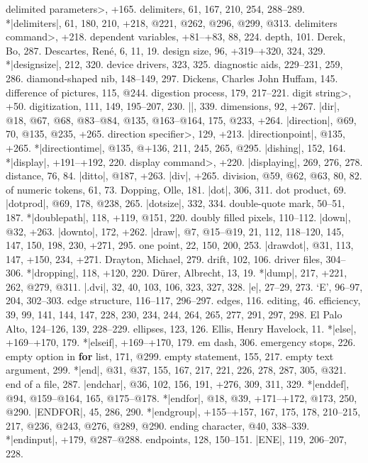 \<delimited parameters>, +165.
delimiters, 61, 167, 210, 254, 288--289.
*|delimiters|, 61, 180, 210, +218, @221, @262, @296, @299, @313.
\<delimiters command>, +218.
dependent variables, +81--+83, 88, 224.
depth, 101.
Derek, Bo, 287.
Descartes, Ren\'e, 6, 11, 19.
design size, 96, +319--+320, 324, 329.
*|designsize|, 212, 320.
device drivers, 323, 325.
diagnostic aids, 229--231, 259, 286.
diamond-shaped nib, 148--149, 297.
Dickens, Charles John Huffam, 145.
difference of pictures, 115, @244.
digestion process, 179, 217--221.
\<digit string>, +50.
digitization, 111, 149, 195--207, 230.
|\digits|, 339.
dimensions, 92, +267.
|dir|, @18, @67, @68, @83--@84, @135, @163--@164, 175, @233, +264.
|direction|, @69, 70, @135, @235, +265.
\<direction specifier>, 129, +213.
|directionpoint|, @135, +265.
*|directiontime|, @135, @+136, 211, 245, 265, @295.
|dishing|, 152, 164.
*|display|, +191--+192, 220.
\<display command>, +220.
|displaying|, 269, 276, 278.
distance, 76, 84.
|ditto|, @187, +263.
|div|, +265.
division, @59, @62, @63, 80, 82.
\sub of numeric tokens, 61, 73.
Dopping, Olle, 181.
|dot|, 306, 311.
dot product, 69.
|dotprod|, @69, 178, @238, 265.
|dotsize|, 332, 334.
double-quote mark, 50--51, 187.
*|doublepath|, 118, +119, @151, 220.
doubly filled pixels, 110--112.
|down|, @32, +263.
|downto|, 172, +262.
|draw|, @7, @15--@19, 21, 112, 118--120, 145, 147, 150, 198, 230, +271, 295.
\sub one point, 22, 150, 200, 253.
|drawdot|, @31, 113, 147, +150, 234, +271.
Drayton, Michael, 279.
drift, 102, 106.
driver files, 304--306.
*|dropping|, 118, +120, 220.
D\"urer, Albrecht, 13, 19.
*|dump|, 217, +221, 262, @279, @311.
|.dvi|, 32, 40, 103, 106, 323, 327, 328.
\newletter
|e|, 27--29, 273.
`E', 96--97, 204, 302--303.
edge structure, 116--117, 296--297.
edges, 116.
editing, 46.
efficiency, 39, 99, 141, 144, 147, 228, 230, 234, 244, 264, 265, 277,
 291, 297, 298.
El Palo Alto, 124--126, 139, 228--229.
ellipses, 123, 126.
Ellis, Henry Havelock, 11.
*|else|, +169--+170, 179.
*|elseif|, +169--+170, 179.
em dash, 306.
emergency stops, 226.
empty option in {\bf for\/} list, 171, @299.
empty statement, 155, 217.
empty text argument, 299.
*|end|, @31, @37, 155, 167, 217, 221, 226, 278, 287, 305, @321.
end of a file, 287.
|endchar|, @36, 102, 156, 191, +276, 309, 311, 329.
*|enddef|, @94, @159--@164, 165, @175--@178.
*|endfor|, @18, @39, +171--+172, @173, 250, @290.
|ENDFOR|, 45, 286, 290.
*|endgroup|, +155--+157, 167, 175, 178, 210--215, 217, @236, @243,
 @276, @289, @290.
ending character, @40, 338--339.
*|endinput|, +179, @287--@288.
endpoints, 128, 150--151.
|ENE|, 119, 206--207, 228.
